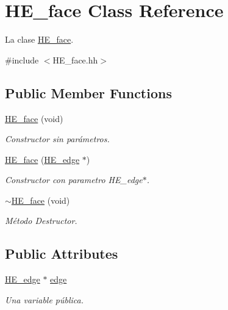 \hypertarget{class_h_e__face}{\section{H\-E\-\_\-face Class Reference}
\label{class_h_e__face}
}


La clase \hyperlink{class_h_e__face}{H\-E\-\_\-face}.  




{\ttfamily \#include $<$H\-E\-\_\-face.\-hh$>$}

\subsection*{Public Member Functions}
\begin{DoxyCompactItemize}
\item 
\hyperlink{class_h_e__face_a5a42e8e7beb962f0d0c27108a61ff79d}{H\-E\-\_\-face} (void)
\begin{DoxyCompactList}\small\item\em Constructor sin parámetros. \end{DoxyCompactList}\item 
\hyperlink{class_h_e__face_a3330fcf146ccd9f35cc2b80222945680}{H\-E\-\_\-face} (\hyperlink{class_h_e__edge}{H\-E\-\_\-edge} $\ast$)
\begin{DoxyCompactList}\small\item\em Constructor con parametro H\-E\-\_\-edge$\ast$. \end{DoxyCompactList}\item 
\hypertarget{class_h_e__face_a6b4e8b2669e7cdf54b97af891364544c}{\hyperlink{class_h_e__face_a6b4e8b2669e7cdf54b97af891364544c}{$\sim$\-H\-E\-\_\-face} (void)}\label{class_h_e__face_a6b4e8b2669e7cdf54b97af891364544c}

\begin{DoxyCompactList}\small\item\em Método Destructor. \end{DoxyCompactList}\end{DoxyCompactItemize}
\subsection*{Public Attributes}
\begin{DoxyCompactItemize}
\item 
\hyperlink{class_h_e__edge}{H\-E\-\_\-edge} $\ast$ \hyperlink{class_h_e__face_a11989659578fb40c2586d452d298eb03}{edge}
\begin{DoxyCompactList}\small\item\em Una variable pública. \end{DoxyCompactList}\end{DoxyCompactItemize}


